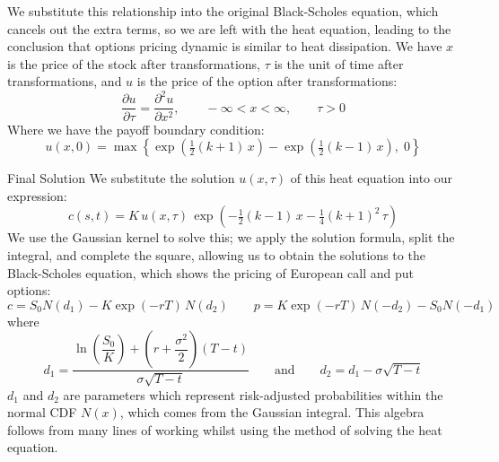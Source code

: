 \begin{frame}
    We substitute this relationship into the original Black-Scholes equation, which cancels out the extra terms, so we are left with the heat equation, leading to the conclusion that options pricing dynamic is similar to heat dissipation. We have $x$ is the price of the stock after transformations, $\tau$ is the unit of time after transformations, and $u$ is the price of the option after transformations:
    \[\frac{\partial u}{\partial \tau} = \frac{\partial^2 u}{\partial x^2}, \qquad -\infty < x < \infty, \qquad \tau > 0\]
    Where we have the payoff boundary condition:
    \[u(x,0) = \max\!\left\{\exp\!\left(\tfrac{1}{2}(k+1)\,x\right) - \exp\!\left(\tfrac{1}{2}(k-1)\,x\right),\; 0\right\}\]
\end{frame}

\begin{frame}{Final Solution}
    We substitute the solution $u(x, \tau)$ of this heat equation into our expression:
    \[c(s,t) = K\, u(x,\tau)\, \exp\!\left(-\tfrac{1}{2}(k - 1)\,x - \tfrac{1}{4}(k + 1)^2\,\tau \right)\]
    We use the Gaussian kernel to solve this; we apply the solution formula, split the integral, and complete the square, allowing us to obtain the solutions to the Black-Scholes equation, which shows the pricing of European call and put options:
    \[c = S_0 N(d_1) - K\exp(-rT)\,N(d_2) \qquad p = K\exp(-rT)\,N(-d_2) - S_0 N(-d_1)\]
    where
    \[d_1 = \frac{\ln\!\left(\dfrac{S_0}{K}\right) + \left(r + \dfrac{\sigma^2}{2}\right)(T - t)}{\sigma\sqrt{T - t}} \qquad \text{and} \qquad d_2 = d_1 - \sigma\sqrt{T - t}\]
    $d_1$ and $d_2$ are parameters which represent risk-adjusted probabilities within the normal CDF $N(x)$, which comes from the Gaussian integral. This algebra follows from many lines of working whilst using the method of solving the heat equation.
\end{frame}

